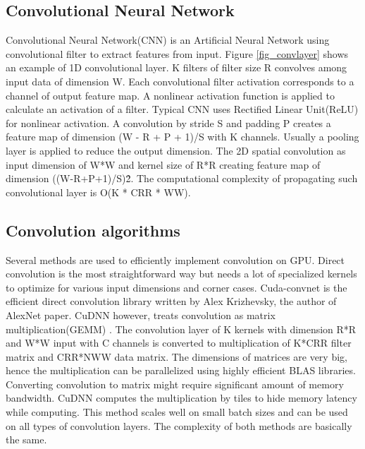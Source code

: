 \documentclass[conference]{IEEEtran}
\begin{document}
\subsection{Convolutional Neural Network}
Convolutional Neural Network(CNN) is an Artificial Neural Network using convolutional filter to extract features from input.
Figure \ref{fig_convlayer} shows an example of 1D convolutional layer.
K filters of filter size R convolves among input data of dimension W.
Each convolutional filter activation corresponds to a channel of output feature map.
A nonlinear activation function is applied to calculate an activation of a filter.
Typical CNN uses Rectified Linear Unit(ReLU) for nonlinear activation.
A convolution by stride S and padding P creates a feature map of dimension (W - R + P + 1)/S with K channels.
Usually a pooling layer is applied to reduce the output dimension.
The 2D spatial convolution as input dimension of W*W and kernel size of R*R creating feature map of dimension ((W-R+P+1)/S)\^2.
The computational complexity of propagating such convolutional layer is O(K * CRR * WW).

\subsection{Convolution algorithms}
Several methods are used to efficiently implement convolution on GPU.
Direct convolution is the most straightforward way but needs a lot of specialized kernels to optimize for various input dimensions and corner cases.
Cuda-convnet \cite{cuda-convnet} is the efficient direct convolution library written by Alex Krizhevsky, the author of AlexNet paper.
CuDNN however, treats convolution as matrix multiplication(GEMM) \cite{cudnn}.
The convolution layer of K kernels with dimension R*R and W*W input with C channels is converted to multiplication of K*CRR filter matrix and CRR*NWW data matrix.
The dimensions of matrices are very big, hence the multiplication can be parallelized using highly efficient BLAS libraries.
Converting convolution to matrix might require significant amount of memory bandwidth.
CuDNN computes the multiplication by tiles to hide memory latency while computing.
This method scales well on small batch sizes and can be used on all types of convolution layers.
The complexity of both methods are basically the same.
\end{document}
